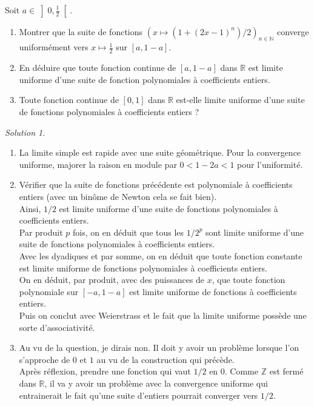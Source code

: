 \documentclass[french]{book}
\newcommand{\N}{\mathbb{N}}
\newcommand{\Z}{\mathbb{Z}}
\newcommand{\R}{\mathbb{R}}
\theoremstyle{definition}
\theoremstyle{remark}
\newtheorem*{sol}{Solution}
\begin{document}
\begin{exo}[2]{}
	Soit $a\in\displaystyle\left]0,\frac{1}{2}\right[$.
	\begin{enumerate}
		\item Montrer que la suite de fonctions $\displaystyle\left(x\mapsto(1+(2x-1)^n)/2\right)_{n\in\N}$ converge uniformément vers $x\mapsto\displaystyle\frac12$ sur $[a,1-a]$.
		\item En déduire que toute fonction continue de $[a,1-a]$ dans $\R$ est limite uniforme d'une suite de fonction polynomiales à coefficients entiers.
		\item Toute fonction continue de $[0,1]$ dans $\R$ est-elle limite uniforme d'une suite de fonctions polynomiales à coefficients entiers ?
	\end{enumerate}
\end{exo}
\begin{sol}
	\begin{enumerate}
		\item La limite simple est rapide avec une suite géométrique. Pour la convergence uniforme, majorer la raison en module par $0<1-2a<1$ pour l'uniformité.
		\item Vérifier que la suite de fonctions précédente est polynomiale à coefficients entiers (avec un binôme de Newton cela se fait bien). \\ Ainsi, $1/2$ est limite uniforme d'une suite de fonctions polynomiales à coefficients entiers. \\ Par produit $p$ fois, on en déduit que tous les $1/2^p$ sont limite uniforme d'une suite de fonctions polynomiales à coefficients entiers. \\  Avec les dyadiques et par somme, on en déduit que toute fonction constante est limite uniforme de fonctions polynomiales à coefficients entiers. \\ On en déduit, par produit, avec des puissances de $x$, que toute fonction polynomiale sur $[-a,1-a]$ est limite uniforme de fonctions à coefficients entiers. \\ Puis on conclut avec Weierstrass et le fait que la limite uniforme possède une sorte d'associativité.
		\item Au vu de la question, je dirais non. Il doit y avoir un problème lorsque l'on s'approche de $0$ et $1$ au vu de la construction qui précède. \\  Après réflexion, prendre une fonction qui vaut $1/2$ en $0$. Comme $\Z$ est fermé dans $\R$, il va y avoir un problème avec la convergence uniforme qui entrainerait le fait qu'une suite d'entiers pourrait converger vers $1/2$.
	\end{enumerate}
\end{sol}
\end{document}
